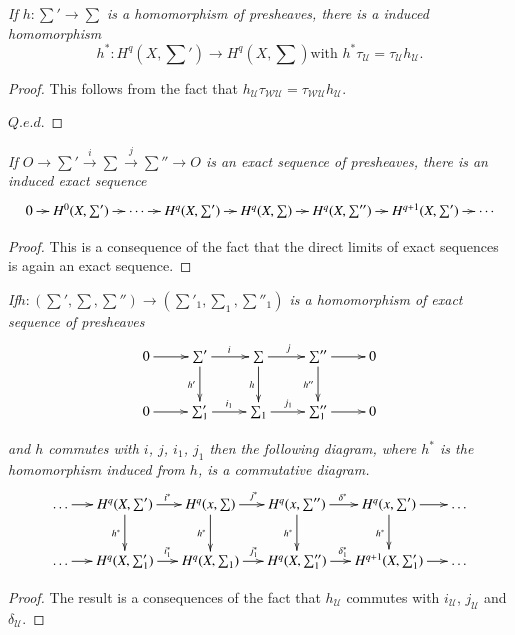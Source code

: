 \textit{If $h: \sum' \to \sum$ is a homomorphism of presheaves, there
  is a induced homomorphism} 
$$
h^*:H^q (X,\sum') \to H^q(X, \sum) \text{with } h^* \tau_\mathscr{U}=
\tau_\mathscr{U} h_\mathscr{U}. 
$$
\begin{proof}
This follows from the fact that $h_\mathscr{U} \tau_{\mathscr{W}
  \mathscr{U}}=\tau _{\mathscr{W}\mathscr{U}} h_\mathscr{U}$. 

\hfill {$Q.e.d$.}
\end{proof}

\textit{If $O\to \sum ' \xrightarrow{i} \sum \xrightarrow{j} \sum'' 
\to O$ is an exact sequence of presheaves, there is an
  induced exact sequence} 
{\fontsize{8}{10}\selectfont
\[
\xymatrix@C=0.3cm{
0\ar[r]&  H^0 (X, \sum')  \ar[r] & \cdots \ar[r]& H^q(X,\sum') \ar[r]
&  H^q(X,\sum) \ar[r] & H^q (X,\sum'') \ar[r]&  H^{q+1}(X, \sum ')
\ar[r]&  \cdots 
}
\]}\relax

\begin{proof}
This is a consequence of the fact that the direct limits of exact
sequences is again an exact sequence. 
\end{proof}

\textit{If\pageoriginale $h: (\sum ', \sum ,\sum'') \to (\sum '_1 ,\sum _1,
\sum''_1)$  is a homomorphism of exact sequence of presheaves} 
\[
\xymatrix{
0 \ar[r] & \sum'\ar[r]^i\ar[d]_{h'} & \sum \ar[r]^j\ar[d]_h &
\sum''\ar[r]\ar[d]_{h''} & 0\\
0 \ar[r] & \sum'_1 \ar[r]^{i_1} & \sum_1 \ar[r]^{j_1} & \sum''_1
\ar[r] & 0
 }
\]

\noindent
\textit{and $h$ commutes with $i$, $j$, $i_1$, $j_1$ then the
  following diagram, where $h^*$ is the homomorphism induced from $h$,
  is a commutative diagram.} 
{\fontsize{9}{11}\selectfont
\[
\xymatrix@C=0.5cm{
\ldots \ar[r] & H^q (X,\sum') \ar[r]^{i^{\ast}} \ar[d]_{h^{\ast}} &
H^q(x,\sum) \ar[r]^{j^{\ast}} \ar[d]_{h^{\ast}} & H^q(x,\sum'')
\ar[r]^{\delta^{\ast}} \ar[d]_{h^{\ast}} & H^q(x,\sum')
\ar[r]\ar[d]_{h^{\ast}} & \ldots\\
\ldots \ar[r] & H^q(X,\sum'_1) \ar[r]^{i^{\ast}_1} & H^q(X,\sum_1)
\ar[r]^{j^{\ast}_1} & H^q(X,\sum''_1) \ar[r]^{\delta^{\ast}_1}&
H^{q+1}(X,\sum'_1) \ar[r] & \ldots
}
\]}\relax


\begin{proof}
The result is a consequences of the fact that $h_{\mathscr{U}}$
commutes with $i_\mathscr{U}$, $j_\mathscr{U}$ and $\delta
_\mathscr{U}$. 
\end{proof}

